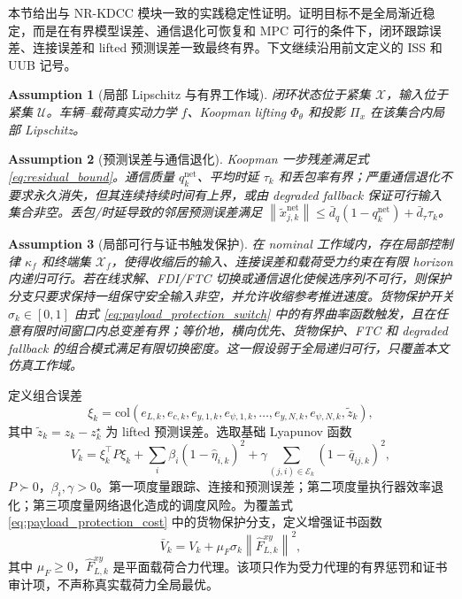 \documentclass[twocolumn,3p,times,procedia]{elsarticle}
\newcommand{\Method}{NR-KDCC}
\newcommand{\norm}[1]{\left\lVert #1 \right\rVert}
\newtheorem{assumption}{Assumption}
\begin{document}
本节给出与 \Method{} 模块一致的实践稳定性证明。证明目标不是全局渐近稳定，而是在有界模型误差、通信退化可恢复和 MPC 可行的条件下，闭环跟踪误差、连接误差和 lifted 预测误差一致最终有界。下文继续沿用前文定义的 ISS 和 UUB 记号。

\begin{assumption}[局部 Lipschitz 与有界工作域]
闭环状态位于紧集 $\mathcal X$，输入位于紧集 $\mathcal U$。车辆--载荷真实动力学 $f$、Koopman lifting $\Phi_\theta$ 和投影 $\Pi_x$ 在该集合内局部 Lipschitz。
\end{assumption}

\begin{assumption}[预测误差与通信退化]
Koopman 一步残差满足式 \eqref{eq:residual_bound}。通信质量 $q_k^{\mathrm{net}}$、平均时延 $\tau_k$ 和丢包率有界；严重通信退化不要求永久消失，但其连续持续时间有上界，或由 degraded fallback 保证可行输入集合非空。丢包/时延导致的邻居预测误差满足 $\norm{\tilde x_{j,k}^{\mathrm{net}}}\le \bar d_q(1-q_k^{\mathrm{net}})+\bar d_\tau \tau_k$。
\end{assumption}

\begin{assumption}[局部可行与证书触发保护]
在 nominal 工作域内，存在局部控制律 $\kappa_f$ 和终端集 $\mathcal X_f$，使得收缩后的输入、连接误差和载荷受力约束在有限 horizon 内递归可行。若在线求解、FDI/FTC 切换或通信退化使候选序列不可行，则保护分支只要求保持一组保守安全输入非空，并允许收缩参考推进速度。货物保护开关 $\sigma_k\in[0,1]$ 由式 \eqref{eq:payload_protection_switch} 中的有界曲率函数触发，且在任意有限时间窗口内总变差有界；等价地，横向优先、货物保护、FTC 和 degraded fallback 的组合模式满足有限切换密度。这一假设弱于全局递归可行，只覆盖本文仿真工作域。
\end{assumption}

定义组合误差
\begin{equation}
\xi_k=\mathrm{col}\left(e_{L,k},e_{c,k},e_{y,1,k},e_{\psi,1,k},\ldots,e_{y,N,k},e_{\psi,N,k},\tilde z_k\right),
\label{eq:xi_def}
\end{equation}
其中 $\tilde z_k=z_k-z_k^\star$ 为 lifted 预测误差。选取基础 Lyapunov 函数
\begin{equation}
V_k=\xi_k^\top P\xi_k+\sum_i \beta_i(1-\hat\eta_{i,k})^2+\gamma\sum_{(j,i)\in\mathcal E_k}(1-\bar q_{ij,k})^2 ,
\label{eq:lyapunov}
\end{equation}
$P\succ0$，$\beta_i,\gamma>0$。第一项度量跟踪、连接和预测误差；第二项度量执行器效率退化；第三项度量网络退化造成的调度风险。为覆盖式 \eqref{eq:payload_protection_cost} 中的货物保护分支，定义增强证书函数
\begin{equation}
\bar V_k=V_k+\mu_F\sigma_k\norm{\hat F_{L,k}^{xy}}^2 ,
\label{eq:augmented_lyapunov}
\end{equation}
其中 $\mu_F\ge0$，$\hat F_{L,k}^{xy}$ 是平面载荷合力代理。该项只作为受力代理的有界惩罚和证书审计项，不声称真实载荷力全局最优。
\end{document}
